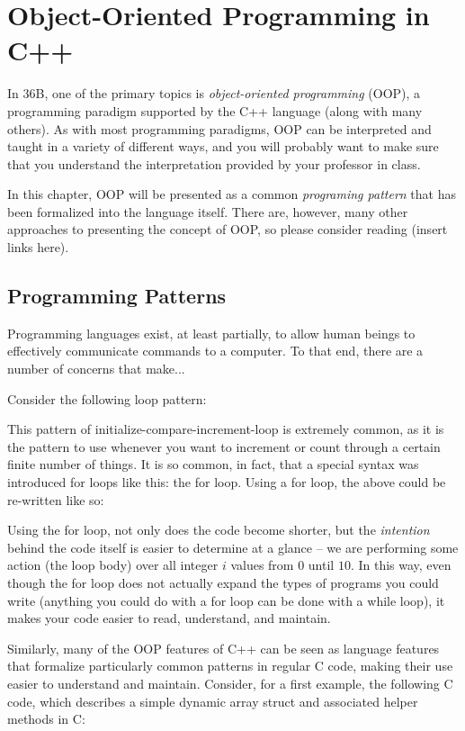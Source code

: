 \chapter{Object-Oriented Programming in C++}
In 36B, one of the primary topics is \textit{object-oriented programming}
(OOP), a programming paradigm supported by the C++ language (along with many
others). As with most programming paradigms, OOP can be interpreted and taught
in a variety of different ways, and you will probably want to make sure that
you understand the interpretation provided by your professor in class.

In this chapter, OOP will be presented as a common \textit{programing pattern}
that has been formalized into the language itself. There are, however, many
other approaches to presenting the concept of OOP, so please consider reading
(insert links here).

\section{Programming Patterns}
Programming languages exist, at least partially, to allow human beings to
effectively communicate commands to a computer. To that end, there are a number
of concerns that make...

Consider the following loop pattern:



This pattern of initialize-compare-increment-loop is extremely common, as it is
the pattern to use whenever you want to increment or count through a certain
finite number of things. It is so common, in fact, that a special syntax was
introduced for loops like this: the for loop. Using a for loop, the above could
be re-written like so:



Using the for loop, not only does the code become shorter, but the
\textit{intention} behind the code itself is easier to determine at a glance --
we are performing some action (the loop body) over all integer $i$ values from
$0$ until $10$. In this way, even though the for loop does not actually expand
the types of programs you could write (anything you could do with a for loop
can be done with a while loop), it makes your code easier to read, understand,
and maintain.

Similarly, many of the OOP features of C++ can be seen as language features
that formalize particularly common patterns in regular C code, making their use
easier to understand and maintain. Consider, for a first example, the following
C code, which describes a simple dynamic array struct and associated helper
methods in C:

